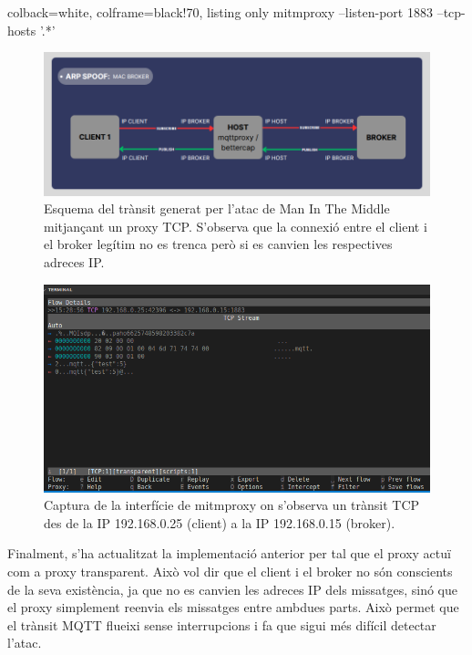   \begin{tcblisting}{colback=white, colframe=black!70, listing only}
  mitmproxy --listen-port 1883 --tcp-hosts '.*'
  \end{tcblisting}

  \begin{figure}[H]
    \centering
    \includegraphics[width=1\textwidth]{img/mitmproxy.png}
    \caption{Esquema del trànsit generat per l'atac de Man In The Middle mitjançant un proxy TCP. S'observa que la connexió entre el client i el broker legítim no es trenca però si es canvien les respectives adreces IP.}
    \label{fig:MITMproxy}
  \end{figure}

  \begin{figure}[H]
    \centering
    \includegraphics[width=1\textwidth]{img/mitmcapt.png}
    \caption{Captura de la interfície de mitmproxy on s'observa un trànsit TCP des de la IP 192.168.0.25 (client) a la IP 192.168.0.15 (broker).}
    \label{fig:MITMcapt}
  \end{figure}

Finalment, s'ha actualitzat la implementació anterior per tal que el proxy actuï com a proxy transparent. Això vol dir que el client i el broker no són conscients de la seva existència, ja que no es canvien les adreces IP dels missatges, sinó que el proxy simplement reenvia els missatges entre ambdues parts. Això permet que el trànsit MQTT flueixi sense interrupcions i fa que sigui més difícil detectar l'atac.

